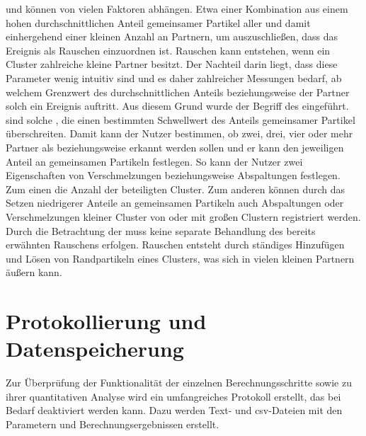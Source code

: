  und  können von vielen Faktoren abhängen. Etwa einer Kombination aus einem hohen durchschnittlichen Anteil gemeinsamer Partikel aller  und damit einhergehend einer kleinen Anzahl an Partnern, um auszuschließen, dass das Ereignis als Rauschen einzuordnen ist. Rauschen kann entstehen, wenn ein Cluster zahlreiche kleine Partner besitzt.
Der Nachteil darin liegt, dass diese Parameter wenig intuitiv sind und es daher zahlreicher Messungen bedarf, ab welchem Grenzwert des durchschnittlichen Anteils beziehungsweise der Partner solch ein Ereignis auftritt. Aus diesem Grund wurde der Begriff des  eingeführt.  sind solche , die einen bestimmten Schwellwert des Anteils gemeinsamer Partikel überschreiten. Damit kann der Nutzer bestimmen, ob zwei, drei, vier oder mehr Partner als  beziehungsweise  erkannt werden sollen und er kann den jeweiligen Anteil an gemeinsamen Partikeln festlegen.
So kann der Nutzer zwei Eigenschaften von Verschmelzungen beziehungsweise Abspaltungen festlegen. Zum einen die Anzahl der beteiligten Cluster. Zum anderen können durch das Setzen niedrigerer Anteile an gemeinsamen Partikeln auch Abspaltungen oder Verschmelzungen kleiner Cluster von oder mit großen Clustern registriert werden. Durch die Betrachtung der  muss keine separate Behandlung des bereits erwähnten Rauschens erfolgen. Rauschen entsteht durch ständiges Hinzufügen und Lösen von Randpartikeln eines Clusters, was sich in vielen kleinen Partnern äußern kann.

\section{Protokollierung und Datenspeicherung}

Zur Überprüfung der Funktionalität der einzelnen Berechnungsschritte sowie zu ihrer quantitativen Analyse wird ein umfangreiches Protokoll erstellt, das bei Bedarf deaktiviert werden kann. Dazu werden Text- und \gls{csv}-Dateien mit den Parametern und Berechnungsergebnissen erstellt.

